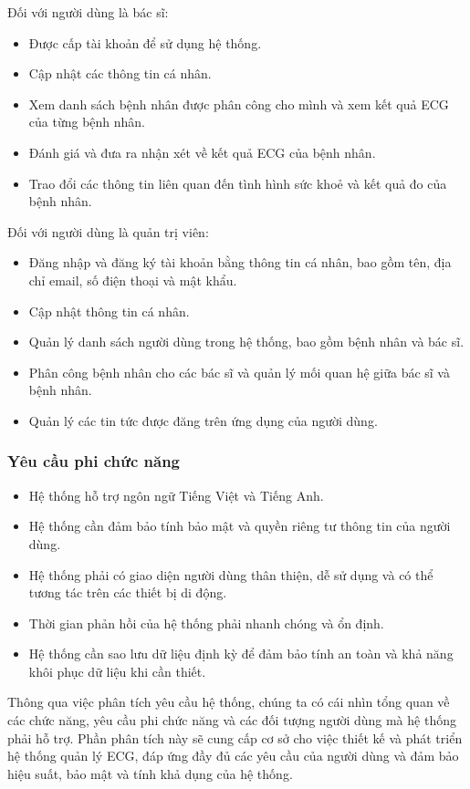 Đối với người dùng là bác sĩ:

\begin{itemize}
    \item Được cấp tài khoản để sử dụng hệ thống.
    \item Cập nhật các thông tin cá nhân.
    \item Xem danh sách bệnh nhân được phân công cho mình và xem kết quả ECG của từng bệnh nhân.
    \item Đánh giá và đưa ra nhận xét về kết quả ECG của bệnh nhân.
    \item Trao đổi các thông tin liên quan đến tình hình sức khoẻ và kết quả đo của bệnh nhân.
\end{itemize}

Đối với người dùng là quản trị viên:
\begin{itemize}
    \item Đăng nhập và đăng ký tài khoản bằng thông tin cá nhân, bao gồm tên, địa chỉ email, số điện thoại và mật khẩu.
    \item Cập nhật thông tin cá nhân.
    \item Quản lý danh sách người dùng trong hệ thống, bao gồm bệnh nhân và bác sĩ.
    \item Phân công bệnh nhân cho các bác sĩ và quản lý mối quan hệ giữa bác sĩ và bệnh nhân.
    \item Quản lý các tin tức được đăng trên ứng dụng của người dùng.
\end{itemize}

\subsubsection{Yêu cầu phi chức năng}
\begin{itemize}
    \item Hệ thống hỗ trợ ngôn ngữ Tiếng Việt và Tiếng Anh.
    \item Hệ thống cần đảm bảo tính bảo mật và quyền riêng tư thông tin của người dùng.
    \item Hệ thống phải có giao diện người dùng thân thiện, dễ sử dụng và có thể tương tác trên các thiết bị di động.
    \item Thời gian phản hồi của hệ thống phải nhanh chóng và ổn định.
    \item Hệ thống cần sao lưu dữ liệu định kỳ để đảm bảo tính an toàn và khả năng khôi phục dữ liệu khi cần thiết.
\end{itemize}

Thông qua việc phân tích yêu cầu hệ thống, chúng ta có cái nhìn tổng quan về các chức năng, yêu cầu phi chức năng và các đối tượng người dùng mà hệ thống phải hỗ trợ. Phần phân tích này sẽ cung cấp cơ sở cho việc thiết kế và phát triển hệ thống quản lý ECG, đáp ứng đầy đủ các yêu cầu của người dùng và đảm bảo hiệu suất, bảo mật và tính khả dụng của hệ thống.
